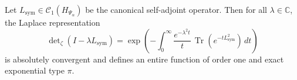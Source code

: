 \begin{lemma}
\label{lem:laplace_heat_trace_convergence}
Let \( L_{\mathrm{sym}} \in \mathcal{C}_1(H_{\Psi_\alpha}) \) be the canonical self-adjoint operator. Then for all \( \lambda \in \mathbb{C} \), the Laplace representation
\begin{equation}
\label{eq:laplace_heat_trace_representation}
\det\nolimits_\zeta(I - \lambda L_{\mathrm{sym}}) = \exp\left( - \int_0^\infty \frac{e^{-\lambda^2 t}}{t} \, \operatorname{Tr}(e^{-t L_{\mathrm{sym}}^2}) \, dt \right)
\end{equation}
is absolutely convergent and defines an entire function of order one and exact exponential type \( \pi \).
\end{lemma}
